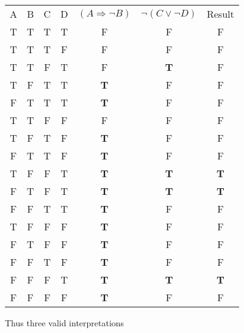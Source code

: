 \begin{enumerate}
\begin{enumerate}
\begin{framed}
    				\begin{tabular}{c|c|c|c|c|c|c}
    					A	&B	&C	&D	&$(A \Rightarrow \lnot B)$	&$\lnot(C \vee \lnot D)$ &Result\\
    					T	&T	&T	&T	&F			&F			&F\\
    					T	&T	&T	&F	&F			&F			&F\\
    					T	&T	&F	&T	&F			&\textbf{T}	&F\\
    					T	&F	&T	&T	&\textbf{T}	&F			&F\\
    					F	&T	&T	&T	&\textbf{T}	&F			&F\\
    					T	&T	&F	&F	&F			&F			&F\\
    					T	&F	&T	&F	&\textbf{T}	&F			&F\\
    					F	&T	&T	&F	&\textbf{T}	&F			&F\\
    					T	&F	&F	&T	&\textbf{T}	&\textbf{T}	&\textbf{T}\\
    					F	&T	&F	&T	&\textbf{T}	&\textbf{T}	&\textbf{T}\\
    					F	&F	&T	&T	&\textbf{T}	&F			&F\\
    					T	&F	&F	&F	&\textbf{T}	&F			&F\\
    					F	&T	&F	&F	&\textbf{T}	&F			&F\\
    					F	&F	&T	&F	&\textbf{T}	&F			&F\\
    					F	&F	&F	&T	&\textbf{T}	&\textbf{T}	&\textbf{T}\\
    					F	&F	&F	&F	&\textbf{T}	&F			&F\\
    				\end{tabular}
    				\FloatBarrier
    				\vspace{5mm}
    				Thus three valid interpretations
    			\end{framed}
    	\end{enumerate}


\end{enumerate}
